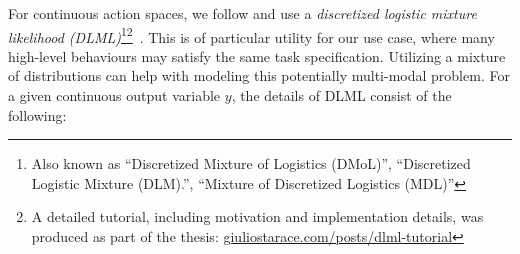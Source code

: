 \documentclass[../main.tex]{subfiles}
\begin{document}
For continuous action spaces, we follow \citet{lynch_learning_2020} and use a \emph{discretized
	logistic mixture likelihood (DLML)}\footnote{Also known as ``Discretized Mixture of Logistics
	(DMoL)'', ``Discretized Logistic Mixture (DLM).'', ``Mixture of Discretized Logistics
	(MDL)''}\footnote{A detailed tutorial, including motivation and implementation details, was produced
	as part of the thesis:
	\href{https://www.giuliostarace.com/posts/dlml-tutorial}{giuliostarace.com/posts/dlml-tutorial}}~\citep{salimans_pixelcnn_2017}. This is of particular utility for our use case, where many
high-level behaviours may satisfy the same task specification. Utilizing a mixture of distributions
can help with modeling this potentially multi-modal problem. For a given continuous output variable
$y$, the details of DLML consist of the following:
\end{document}
